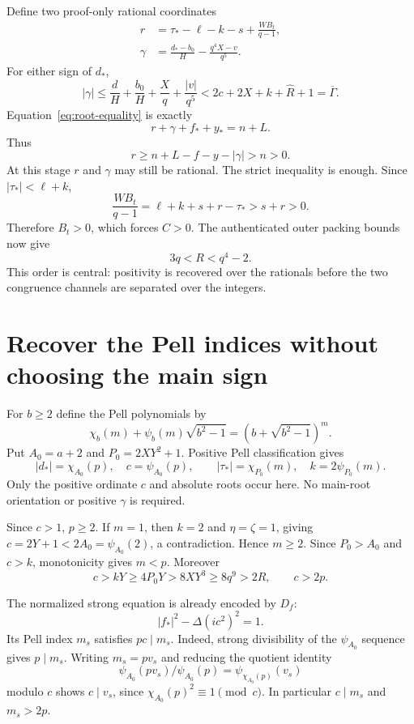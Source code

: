 \documentclass[11pt]{article}
\theoremstyle{remark}
\begin{document}
Define two proof-only rational coordinates
\begin{align}
 r&=\tau_*-\ell-k-s+\frac{WB_t}{q-1},\label{eq:rproof}\\
 \gamma&=\frac{d_*-b_0}{H}-\frac{q^4X-v}{q^5}.\label{eq:gproof}
\end{align}
For either sign of $d_*$,
\[
 |\gamma|
 \le\frac dH+\frac{b_0}H+\frac Xq+\frac{|v|}{q^5}
 <2c+2X+k+\widehat R+1=\overline\Gamma.
\]
Equation~\eqref{eq:root-equality} is exactly
\begin{equation}\label{eq:merge}
 r+\gamma+f_*+y_*=n+L.
\end{equation}
Thus
\[
 r\ge n+L-f-y-|\gamma|>n>0.
\]
At this stage $r$ and $\gamma$ may still be rational. The strict
inequality is enough. Since $|\tau_*|<\ell+k$,
\[
 \frac{WB_t}{q-1}=\ell+k+s+r-\tau_*>s+r>0.
\]
Therefore $B_t>0$, which forces $C>0$. The authenticated outer packing
bounds now give
\begin{equation}\label{eq:Rbounds}
 3q<R<q^4-2.
\end{equation}
This order is central: positivity is recovered over the rationals before
the two congruence channels are separated over the integers.

\section{Recover the Pell indices without choosing the main sign}

For $b\ge2$ define the Pell polynomials by
\[
 \chi_b(m)+\psi_b(m)\sqrt{b^2-1}
 =(b+\sqrt{b^2-1})^m.
\]
Put $A_0=a+2$ and $P_0=2XY^2+1$. Positive Pell classification gives
\begin{equation}\label{eq:classify}
 |d_*|=\chi_{A_0}(p),\quad c=\psi_{A_0}(p),\qquad
 |\tau_*|=\chi_{P_0}(m),\quad k=2\psi_{P_0}(m).
\end{equation}
Only the positive ordinate $c$ and absolute roots occur here. No main-root
orientation or positive $\gamma$ is required.

Since $c>1$, $p\ge2$. If $m=1$, then $k=2$ and
$\eta=\zeta=1$, giving $c=2Y+1<2A_0=\psi_{A_0}(2)$, a contradiction.
Hence $m\ge2$. Since $P_0>A_0$ and $c>k$, monotonicity gives $m<p$.
Moreover
\begin{equation}\label{eq:cgrowth}
 c>kY\ge4P_0Y>8XY^3\ge8q^9>2R,
 \qquad c>2p.
\end{equation}

The normalized strong equation is already encoded by $D_f$:
\[
 |f_*|^2-\Delta(ic^2)^2=1.
\]
Its Pell index $m_s$ satisfies $pc\mid m_s$. Indeed, strong divisibility
of the $\psi_{A_0}$ sequence gives $p\mid m_s$. Writing $m_s=pv_s$
and reducing the quotient identity
\[
 \psi_{A_0}(pv_s)/\psi_{A_0}(p)=\psi_{\chi_{A_0}(p)}(v_s)
\]
modulo $c$ shows $c\mid v_s$, since
$\chi_{A_0}(p)^2\equiv1\pmod c$. In particular $c\mid m_s$ and
$m_s>2p$.
\end{document}
